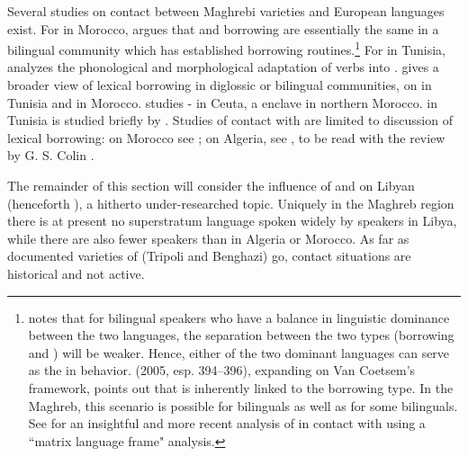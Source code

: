 \documentclass[output=paper]{langsci/langscibook}
\begin{document}
Several studies on contact between Maghrebi  varieties and European languages exist. For  in Morocco, \citet{Heath1989} argues that  and borrowing are essentially the same in a bilingual community which has established borrowing routines.\footnote{\citet[87]{VanCoetsem1988} notes that for bilingual speakers who have a balance in linguistic dominance between the two languages, the separation between the two  types (borrowing and ) will be weaker. Hence, either of the two dominant languages can serve as the  in  behavior. \citeauthor{Winford2005} (2005, esp. 394–396), expanding on Van Coetsem’s framework, points out that  is inherently linked to the borrowing  type. In the Maghreb, this scenario is possible for \textendash {} bilinguals as well as for some \textendash {} bilinguals. See \citet{Ziamari2008} for an insightful and more recent analysis of   in contact with  using a ``matrix language frame" analysis.} For  in Tunisia, \citet{Talmoudi1986} analyzes the phonological and morphological adaptation of  verbs into . \citet[127–151]{Sayahi2014} gives a broader view of lexical borrowing in diglossic or bilingual communities,  on  in Tunisia and  in Morocco. \citet{Vicente2005} studies -  in Ceuta, a  enclave in northern Morocco.  in Tunisia is studied briefly by \citet{Cifoletti1994}. Studies of contact with  are limited to discussion of lexical borrowing: on Morocco see \citet{Procházka2012}; on Algeria, see \citet{BenCheneb1922}, to be read with the review by G. S. Colin \citep[21–30]{Colin1999}.

The remainder of this section will consider the influence of  and  on Libyan  (henceforth ), a hitherto under-researched topic. Uniquely in the Maghreb region there is at present no superstratum language spoken widely by  speakers in Libya, while there are also fewer  speakers than in Algeria or Morocco. As far as documented varieties of  (Tripoli and Benghazi) go, contact situations are historical and not active.
\end{document}
